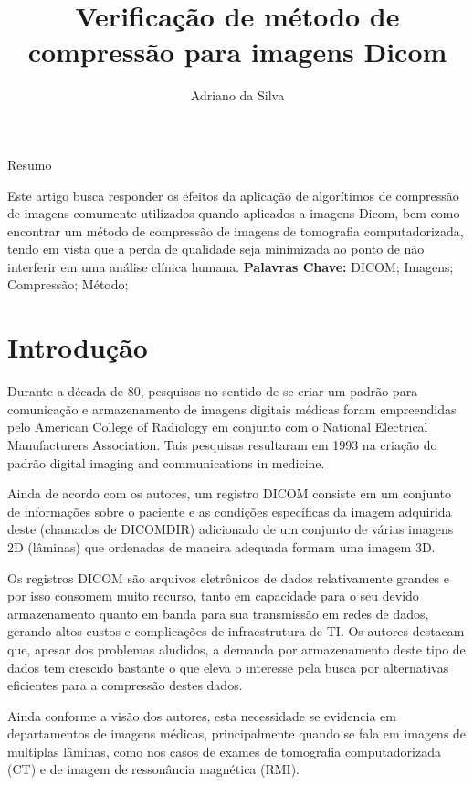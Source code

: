 \documentclass{IEEEtran}
\title{Verificação de método de compressão para imagens Dicom}
\author{Adriano da Silva}
\begin{document}
    
    
    \maketitle
    
    

    
    Resumo 

    Este artigo busca responder os efeitos da aplicação de algorítimos de
compressão de imagens comumente utilizados quando aplicados a imagens
Dicom, bem como encontrar um método de compressão de imagens de
tomografia computadorizada, tendo em vista que a perda de qualidade seja
minimizada ao ponto de não interferir em uma análise clínica humana.
\textbf{Palavras Chave:} DICOM; Imagens; Compressão; Método;

    \section{Introdução}\label{introduuxe7uxe3o}

    Durante a década de 80, pesquisas no sentido de se criar um padrão para
comunicação e armazenamento de imagens digitais médicas foram
empreendidas pelo American College of Radiology em conjunto com o
National Electrical Manufacturers Association. Tais pesquisas resultaram
em 1993 na criação do padrão digital imaging and communications in
medicine. \cite{grauer2009working}

Ainda de acordo com os autores, um registro DICOM consiste em um
conjunto de informações sobre o paciente e as condições específicas da
imagem adquirida deste (chamados de DICOMDIR) adicionado de um conjunto
de várias imagens 2D (lâminas) que ordenadas de maneira adequada formam
uma imagem 3D.

Os registros DICOM são arquivos eletrônicos de dados relativamente
grandes e por isso consomem muito recurso, tanto em capacidade para o
seu devido armazenamento quanto em banda para sua transmissão em redes
de dados, gerando altos custos e complicações de infraestrutura de TI.
Os autores destacam que, apesar dos problemas aludidos, a demanda por
armazenamento deste tipo de dados tem crescido bastante o que eleva o
interesse pela busca por alternativas eficientes para a compressão
destes dados.

Ainda conforme a visão dos autores, esta necessidade se evidencia em
departamentos de imagens médicas, principalmente quando se fala em
imagens de multiplas lâminas, como nos casos de exames de tomografia
computadorizada (CT) e de imagem de ressonância magnética (RMI).
\end{document}
